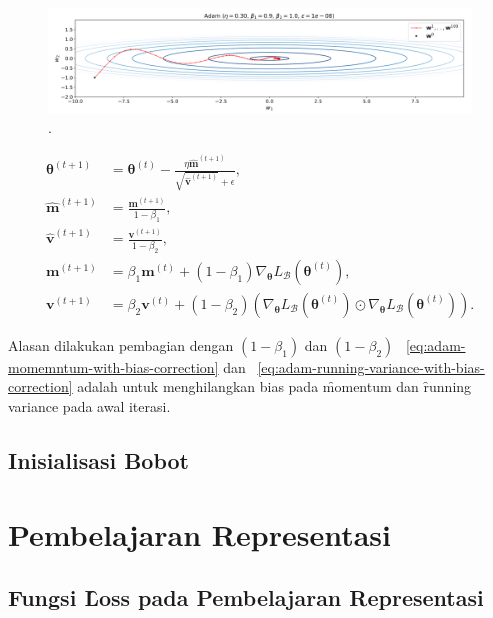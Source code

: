 \begin{figure}
    \centering
    \includegraphics[width=1\textwidth]{assets/pics/adam.png}
    \caption{\license.}
    \label{fig:adam}
\end{figure}

\begin{align}
    \label{eq:adam}
    \bm{\theta}^{(t+1)} &= \bm{\theta}^{(t)} - \frac{\eta \hat{\mathbf{m}}^{(t+1)}}{\sqrt{\hat{\mathbf{v}}^{(t+1)}} + \epsilon}, \\
    \label{eq:adam-momemntum-with-bias-correction}
    \hat{\mathbf{m}}^{(t+1)} &= \frac{\mathbf{m}^{(t+1)}}{1 - \beta_1}, \\
    \label{eq:adam-running-variance-with-bias-correction}
    \hat{\mathbf{v}}^{(t+1)} &= \frac{\mathbf{v}^{(t+1)}}{1 - \beta_2}, \\
    \mathbf{m}^{(t+1)} &= \beta_1 \mathbf{m}^{(t)} + (1 - \beta_1) \nabla_{\bm{\theta}} L_{\mathcal{B}}(\bm{\theta}^{(t)}), \\
    \mathbf{v}^{(t+1)} &= \beta_2 \mathbf{v}^{(t)} + (1 - \beta_2) \left(\nabla_{\bm{\theta}} L_{\mathcal{B}}(\bm{\theta}^{(t)})\odot \nabla_{\bm{\theta}} L_{\mathcal{B}}(\bm{\theta}^{(t)})\right).
\end{align}

Alasan dilakukan pembagian dengan $(1-\beta_1)$ dan $(1-\beta_2)$ \equ~\ref{eq:adam-momemntum-with-bias-correction} dan \equ~\ref{eq:adam-running-variance-with-bias-correction} adalah untuk menghilangkan bias pada \f{momentum} dan \f{running variance} pada awal iterasi.

\subsection{Inisialisasi Bobot}
    \label{sec:kaiminginit}

\section{Pembelajaran Representasi}

    \subsection{Fungsi \f{Loss} pada Pembelajaran Representasi}













        

